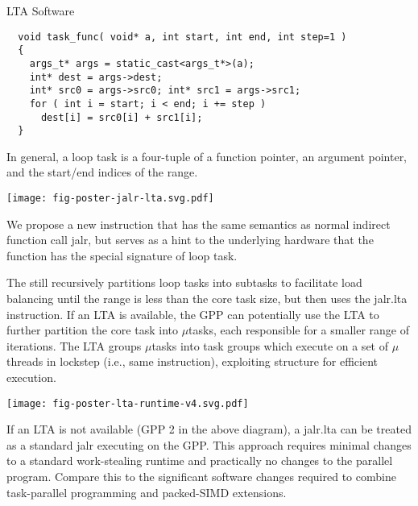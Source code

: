 \documentclass{cbxposter}
\begin{document}
\begin{frame}[fragile,t]{}
\begin{columns}[T]
\begin{column}{10.5in}
\begin{block}{LTA Software}
\begin{lstlisting}
  void task_func( void* a, int start, int end, int step=1 )
  {
    args_t* args = static_cast<args_t*>(a);
    int* dest = args->dest;
    int* src0 = args->src0; int* src1 = args->src1;
    for ( int i = start; i < end; i += step )
      dest[i] = src0[i] + src1[i];
  }
  \end{lstlisting}
  \vspace{0.2in}

  In general, a loop task is a four-tuple of a function pointer, an
  argument pointer, and the start/end indices of the range.

  \vspace{0.1in}

  \vspace{-0.3in}
  \begin{center}
  \texttt{[image: fig-poster-jalr-lta.svg.pdf]}
  \end{center}

  \vspace{0.2in}
  We propose a new  instruction that has the same semantics
  as normal indirect function call jalr, but serves as a hint to the
  underlying hardware that the function has the special signature of loop
  task.


  \vspace{0.1in}

  The  still recursively
  partitions loop tasks into subtasks to facilitate load balancing until
  the range is less than the core task size, but then uses the jalr.lta
  instruction. If an LTA is available, the GPP can potentially use the LTA
  to further partition the core task into $\mu$tasks, each responsible
  for a smaller range of iterations. The LTA groups $\mu$tasks into task
  groups which execute on a set of $\mu$threads in lockstep (i.e., same
  instruction), exploiting structure for efficient execution.

  \vspace{0.5in}
  \texttt{[image: fig-poster-lta-runtime-v4.svg.pdf]}
  \vspace{0.5in}

  If an LTA is not available (GPP 2 in the above diagram), a jalr.lta can
  be treated as a standard jalr executing on the GPP. This approach
  requires minimal changes to a standard work-stealing runtime and
  practically no changes to the parallel program. Compare this to the
  significant software changes required to combine task-parallel
  programming and packed-SIMD extensions.


\end{block}
\end{column}
\end{columns}
\end{frame}
\end{document}
